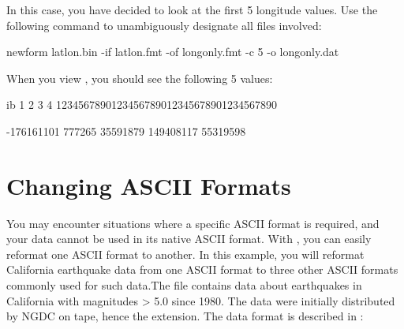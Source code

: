 In this case, you have decided to look at the first 5 longitude values. Use the following command to unambiguously designate all files involved:

\begin{example}
newform latlon.bin -if latlon.fmt -of longonly.fmt -c 5 
       -o longonly.dat
\end{example}

When you view , you should see the following 5 values: 

\begin{vcode}{ib}
         1         2         3         4
1234567890123456789012345678901234567890

                    -176161101
                        777265
                      35591879
                     149408117
                      55319598
\end{vcode}

\section{Changing ASCII Formats}
\label{ff,fmtconv,ascii}

You may encounter situations where a specific ASCII format is
required, and your data cannot be used in its native ASCII format.
With , you can easily reformat one ASCII format to
another. In this example, you will reformat California earthquake data
from one ASCII format to three other ASCII formats commonly used for
such data.The file  contains data about earthquakes in
California with magnitudes > 5.0 since 1980. The data were initially
distributed by NGDC on tape, hence the  extension. The data
format is described in :


